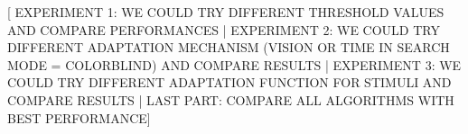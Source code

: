 [ EXPERIMENT 1: WE COULD TRY DIFFERENT THRESHOLD VALUES AND COMPARE PERFORMANCES | EXPERIMENT 2: WE COULD TRY DIFFERENT ADAPTATION MECHANISM (VISION OR TIME IN SEARCH MODE = COLORBLIND) AND COMPARE RESULTS | EXPERIMENT 3: WE COULD TRY DIFFERENT ADAPTATION FUNCTION FOR STIMULI AND COMPARE RESULTS | LAST PART: COMPARE ALL ALGORITHMS WITH BEST PERFORMANCE]